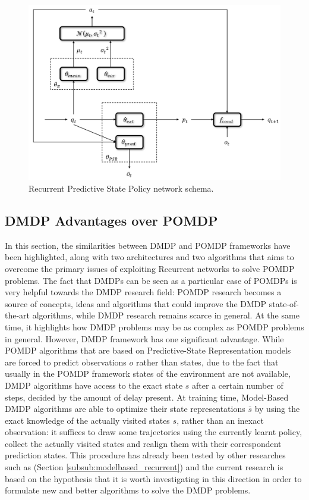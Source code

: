                 \begin{figure}[t]
                    \centering
                    \includegraphics[width=15cm, keepaspectratio]{images/pomdp/pomdp_rpsp.png}
                    \caption{Recurrent Predictive State Policy network schema.}
                    \label{fig:pomdp_rpsp}
                \end{figure}
                
        \newpage        
        \subsection{DMDP Advantages over POMDP}
            In this section, the similarities between DMDP and POMDP frameworks have been highlighted, along with two architectures and two algorithms that aims to overcome the primary issues of exploiting Recurrent networks to solve POMDP problems. The fact that DMDPs can be seen as a particular case of POMDPs is very helpful towards the DMDP research field: POMDP research becomes a source of concepts, ideas and algorithms that could improve the DMDP state-of-the-art algorithms, while DMDP research remains scarce in general. At the same time, it highlights how DMDP problems may be as complex as POMDP problems in general. \newline
            However, DMDP framework has one significant advantage. While POMDP algorithms that are based on Predictive-State Representation models are forced to predict observations $o$ rather than states, due to the fact that usually in the POMDP framework states of the environment are not available, DMDP algorithms have access to the exact state $s$ after a certain number of steps, decided by the amount of delay present. At training time, Model-Based DMDP algorithms are able to optimize their state representations $\bar{s}$ by using the exact knowledge of the actually visited states $s$, rather than an inexact observation: it suffices to draw some trajectories using the currently learnt policy, collect the actually visited states and realign them with their correspondent prediction states. This procedure has already been tested by other researches such as  (Section \ref{subsub:modelbased_recurrent}) and the current research is based on the hypothesis that it is worth investigating in this direction in order to formulate new and better algorithms to solve the DMDP problems.
            